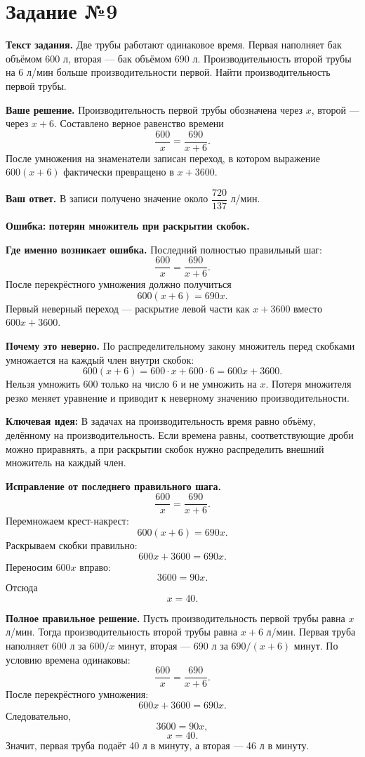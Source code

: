 \documentclass[12pt,a4paper]{article}
\newcommand{\errorlabel}[1]{\textcolor{errred}{\textbf{Ошибка:}} \textbf{#1}}
\newcommand{\keyidea}[1]{\textcolor{ideablue}{\textbf{Ключевая идея:}} #1}
\begin{document}
\newpage
{}\label{task:9}
\section*{Задание №9}
\textbf{Текст задания.} Две трубы работают одинаковое время. Первая наполняет бак объёмом 600 л, вторая --- бак объёмом 690 л. Производительность второй трубы на 6 л/мин больше производительности первой. Найти производительность первой трубы.

\textbf{Ваше решение.} Производительность первой трубы обозначена через $x$, второй --- через $x+6$. Составлено верное равенство времени
\[
\frac{600}{x}=\frac{690}{x+6}.
\]
После умножения на знаменатели записан переход, в котором выражение $600(x+6)$ фактически превращено в $x+3600$.

\textbf{Ваш ответ.} В записи получено значение около $\dfrac{720}{137}$ л/мин.

\errorlabel{потерян множитель при раскрытии скобок.}

\textbf{Где именно возникает ошибка.} Последний полностью правильный шаг:
\[
\frac{600}{x}=\frac{690}{x+6}.
\]
После перекрёстного умножения должно получиться
\[
600(x+6)=690x.
\]
Первый неверный переход --- раскрытие левой части как $x+3600$ вместо $600x+3600$.

\textbf{Почему это неверно.} По распределительному закону множитель перед скобками умножается на каждый член внутри скобок:
\[
600(x+6)=600\cdot x+600\cdot6=600x+3600.
\]
Нельзя умножить 600 только на число 6 и не умножить на $x$. Потеря множителя резко меняет уравнение и приводит к неверному значению производительности.

\keyidea{В задачах на производительность время равно объёму, делённому на производительность. Если времена равны, соответствующие дроби можно приравнять, а при раскрытии скобок нужно распределить внешний множитель на каждый член.}

\textbf{Исправление от последнего правильного шага.}
\[
\frac{600}{x}=\frac{690}{x+6}.
\]
Перемножаем крест-накрест:
\[
600(x+6)=690x.
\]
Раскрываем скобки правильно:
\[
600x+3600=690x.
\]
Переносим $600x$ вправо:
\[
3600=90x.
\]
Отсюда
\[
x=40.
\]

\textbf{Полное правильное решение.} Пусть производительность первой трубы равна $x$ л/мин. Тогда производительность второй трубы равна $x+6$ л/мин. Первая труба наполняет 600 л за $600/x$ минут, вторая --- 690 л за $690/(x+6)$ минут. По условию времена одинаковы:
\[
\frac{600}{x}=\frac{690}{x+6}.
\]
После перекрёстного умножения:
\[
600x+3600=690x.
\]
Следовательно,
\[
3600=90x,
\]
\[
x=40.
\]
Значит, первая труба подаёт 40 л в минуту, а вторая --- 46 л в минуту.
\end{document}
